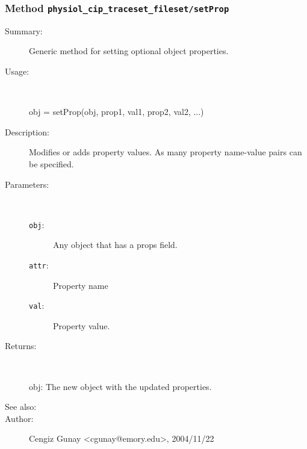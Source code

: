 \subsubsection[Method \texttt{setProp}]{Method \texttt{physiol\_cip\_traceset\_fileset/setProp}}%
%
\label{ref_physiol_cip_traceset_fileset__setProp}%
\hypertarget{ref_physiol_cip_traceset_fileset__setProp}{}%
\begin{description}
\item[Summary:]Generic method for setting optional object properties.
%
\item[Usage:]~%
\begin{lyxcode}%
obj = setProp(obj, prop1, val1, prop2, val2, ...)
%
\end{lyxcode}%
%
\item[Description:]%
Modifies or adds property values. As many property name-value 
 pairs can be specified.
\item[Parameters:]~
\begin{description}%
\item[\texttt{obj}:]
 Any object that has a props field.
\item[\texttt{attr}:]
 Property name
\item[\texttt{val}:]
 Property value.
\end{description}%
%
\item[Returns:
]~

	obj: The new object with the updated properties.
%
%
\item[See also:]%
%
\item[Author:]%
Cengiz Gunay <cgunay@emory.edu>, 2004/11/22
%
\end{description}
\methodline%
